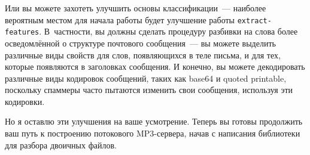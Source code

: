 Или вы можете захотеть улучшить основы классификации~--- наиболее вероятным местом для
начала работы будет улучшение работы \lstinline{extract-features}.  В~частности, вы должны
сделать процедуру разбивки на слова более осведомлённой о структуре почтового сообщения~---
вы можете выделить различные виды свойств для слов, появляющихся в теле письма, и для тех,
которые появляются в заголовках сообщения.  И конечно, вы можете декодировать различные
виды кодировок сообщений, таких как base64 и quoted printable, поскольку спаммеры часто
пытаются изменить свои сообщения, используя эти кодировки.

Но я оставлю эти улучшения на ваше усмотрение.  Теперь вы готовы продолжить ваш путь к
построению потокового MP3-сервера, начав с написания библиотеки для разбора двоичных
файлов.

